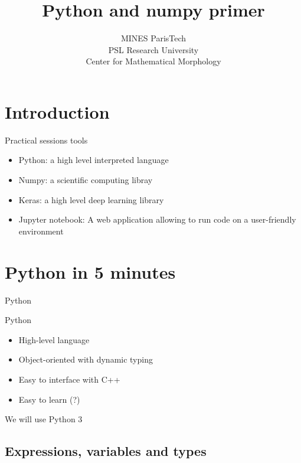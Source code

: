 \documentclass[xcolor=pdftex,dvipsnames,table,mathserif]{beamer}
\title{Python and numpy primer}
\author{}
\date{MINES ParisTech\\
  PSL Research University\\
  Center for Mathematical Morphology
}
\begin{document}
\section*{Introduction}


\begin{frame}{Practical sessions tools}

\begin{itemize}
\item Python: a high level interpreted language
\item Numpy: a scientific computing libray
\item Keras: a high level deep learning library
\item Jupyter notebook: A web application allowing to run code on a user-friendly environment
\end{itemize}

\end{frame}

\section{Python in 5 minutes}

\begin{frame}{Python}

  \begin{block}{Python}
    \begin{itemize}
    \item High-level language
    \item Object-oriented with dynamic typing
    \item Easy to interface with C++
    \item Easy to learn (?)
    \end{itemize}
  \end{block}

\begin{alertblock}{}
  We will use Python 3
\end{alertblock}

\end{frame}

\subsection{Expressions, variables and types}
\end{document}
